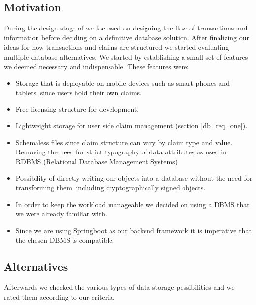\subsection{Motivation}
\label{sec:databaseMotivation}
During the design stage of \projectName{} we focussed on designing the flow of transactions and information before deciding on a definitive database solution.
After finalizing our ideas for how transactions and claims are structured we started evaluating multiple database alternatives.
We started by establishing a small set of features we deemed necessary and indispensable. These features were:
\begin{itemize}
\item \label{db_req_one}
Storage that is deployable on mobile devices such as smart phones and tablets, since users hold their own claims.
\item \label{db_req_two}
Free licensing structure for development.
\item \label{db_item_three}
Lightweight storage for user side claim management (section \ref{db_req_one}).
\item \label{db_req_four}
Schemaless files since claim structure can vary by claim type and value. Removing the need for strict typography of data attributes as used in RDBMS (Relational Database Management Systems)
\item \label{db_req_five}
Possibility of directly writing our objects into a database without the need for transforming them, including cryptographically signed objects.
\item \label{db_req_six}
In order to keep the workload manageable we decided on using a DBMS that we were already familiar with.
\item \label{db_req_seven}
Since we are using Springboot as our backend framework it is imperative that the chosen DBMS is compatible.
\end{itemize}

\subsection{Alternatives}
\label{sec:databaseAlternatives}
Afterwards we checked the various types of data storage possibilities and we rated them according to our criteria.

